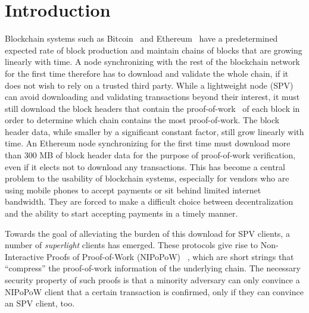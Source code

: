 \section{Introduction}
Blockchain systems such as Bitcoin~\cite{nakamoto} and
Ethereum~\cite{buterin,wood} have a predetermined expected rate of block
production and maintain chains of blocks that are growing linearly
with time. A node synchronizing with the rest of the blockchain
network for the first time therefore has to download and validate the whole
chain, if it does not wish to rely on a trusted third party. While a lightweight
node (SPV) can avoid downloading and validating transactions beyond their
interest, it must still download the block headers that contain the
proof-of-work~\cite{pow} of each block in order to determine which chain contains
the most proof-of-work. The block header data, while smaller by a significant constant
factor, still grow linearly with time. An Ethereum node synchronizing for the
first time must download more than $300$ MB of block header data for the purpose
of proof-of-work verification, even if it elects not to download any
transactions. This has become a central problem to the usability of blockchain
systems, especially for vendors who are using mobile phones to accept payments
or sit behind limited internet bandwidth. They are forced to make a difficult
choice between decentralization and the ability to start accepting payments in a
timely manner.

Towards the goal of alleviating the burden of this download for SPV clients, a
number of \emph{superlight} clients has emerged. 
These protocols give rise to  Non-Interactive Proofs of Proof-of-Work (NIPoPoW)
~\cite{nipopows}, which are short strings
 that ``compress'' the proof-of-work information of the underlying chain. 
The necessary security property of such proofs is that a
minority adversary can only convince a
NIPoPoW client that a certain transaction is confirmed, only if they can
convince an SPV client, too.

